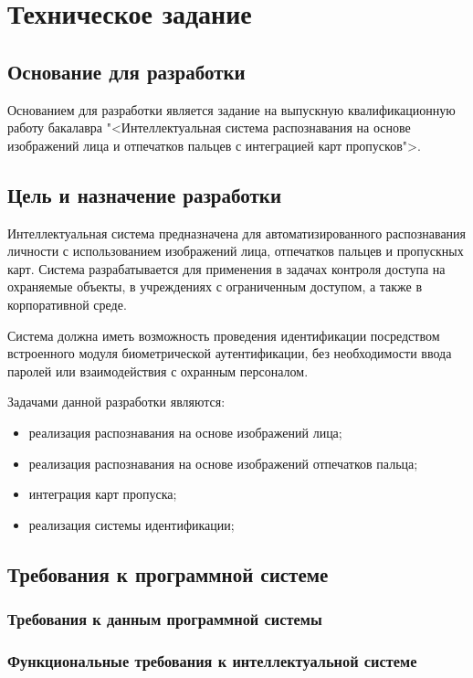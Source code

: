 \section{Техническое задание}
\subsection{Основание для разработки}

Основанием для разработки является задание на выпускную квалификационную работу бакалавра "<Интеллектуальная система распознавания на основе изображений лица и отпечатков пальцев с интеграцией карт пропусков">.

\subsection{Цель и назначение разработки}

Интеллектуальная система предназначена для автоматизированного распознавания личности с использованием изображений лица, отпечатков пальцев и пропускных карт. Система разрабатывается для применения в задачах контроля доступа на охраняемые объекты, в учреждениях с ограниченным доступом, а также в корпоративной среде.

Система должна иметь возможность проведения идентификации посредством встроенного модуля биометрической аутентификации, без необходимости ввода паролей или взаимодействия с охранным персоналом.

Задачами данной разработки являются:
\begin{itemize}
\item реализация распознавания на основе изображений лица;
\item реализация распознавания на основе изображений отпечатков пальца;
\item интеграция карт пропуска;
\item реализация системы идентификации;
\end{itemize}

\subsection{Требования к программной системе}

\subsubsection{Требования к данным программной системы}


\subsubsection{Функциональные требования к интеллектуальной системе}

